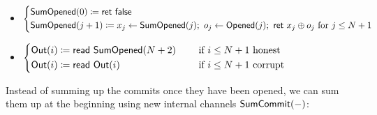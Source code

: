 \begin{itemize}
\item {\color{red} $\begin{cases*} \SumOpened(0) \coloneqq \ret{\false} \\ \SumOpened(j+1) \coloneqq x_j \leftarrow \SumOpened(j); \ o_j \leftarrow \Opened(j); \ \ret{x_j \oplus o_j} \text{ for $j \leq N+1$} \end{cases*}$}
\item $\begin{cases*} \Out(i) \coloneqq \read{\SumOpened(N+2)} & \hspace{10pt} \text{if $i \leq N+1$ honest} \\ \Out(i) \coloneqq \read{\Out(i)} & \hspace{10pt} \text{if $i \leq N+1$ corrupt} \end{cases*}$
\end{itemize}

\noindent Instead of summing up the commits once they have been opened, we can sum them up at the beginning using new internal channels $\mathsf{SumCommit}(-)$:

